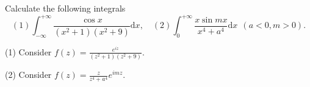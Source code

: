 \begin{example}{}{}
  Calculate the following integrals
  \begin{equation}
    (1) \int_{-\infty}^{+\infty} \frac{\cos x}{(x^2 + 1)(x^2 + 9)}\mathrm{d} x, \quad
    (2) \int_0^{+\infty} \frac{x \sin mx}{x^4 + a^4}\mathrm{d} x ~~ (a < 0, m > 0).
  \end{equation}
\end{example}

\begin{solution}
  (1) Consider $f(z) = \frac{e^{iz}}{(z^2 + 1)(z^2 + 9)}$.

  (2) Consider $f(z) = \frac{z}{z^4 + a^4}e^{imz}$.
\end{solution}
